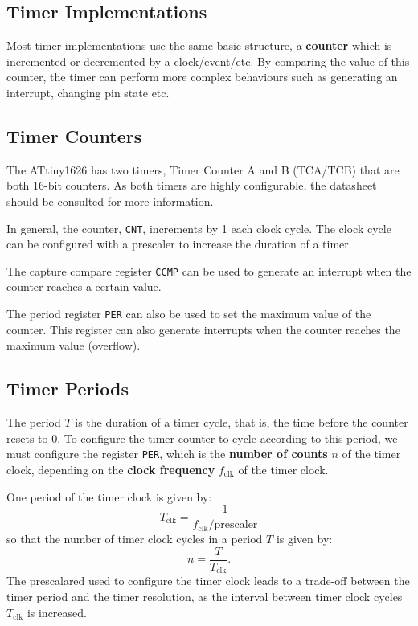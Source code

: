 \documentclass[a4paper]{report}
\begin{document}
\subsection{Timer Implementations}
Most timer implementations use the same basic structure,
a \textbf{counter} which is incremented or decremented by a clock/event/etc.
By comparing the value of this counter, the timer can perform
more complex behaviours such as generating an interrupt, changing pin state etc.
\subsection{Timer Counters}
The ATtiny1626 has two timers, Timer Counter A and B (TCA/TCB)
that are both 16-bit counters. As both timers are highly configurable,
the datasheet should be consulted for more information.

In general, the counter, \texttt{CNT}, increments
by 1 each clock cycle. The clock cycle can be configured with a prescaler
to increase the duration of a timer.

The capture compare register \texttt{CCMP} can be used to
generate an interrupt when the counter reaches a certain value.

The period register \texttt{PER} can also be used to
set the maximum value of the counter. This register can also generate
interrupts when the counter reaches the maximum value (overflow).
\subsection{Timer Periods}
The period \(T\) is the duration of a timer cycle, that is, the time before the counter
resets to 0. To configure the timer counter to cycle according to this period, we must
configure the register \texttt{PER}, which is the \textbf{number of counts} \(n\) of the
timer clock, depending on the \textbf{clock frequency} \(f_\mathrm{clk}\) of the timer clock.

One period of the timer clock is given by:
\begin{equation*}
    T_\mathrm{clk} = \frac{1}{f_\mathrm{clk} / \mathrm{prescaler}}
\end{equation*}
so that the number of timer clock cycles in a period \(T\) is given by:
\begin{equation*}
    n = \frac{T}{T_\mathrm{clk}}.
\end{equation*}
The prescalared used to configure the timer clock leads to a trade-off between
the timer period and the timer resolution, as the interval between timer clock cycles \(T_\mathrm{clk}\)
is increased.
\end{document}
